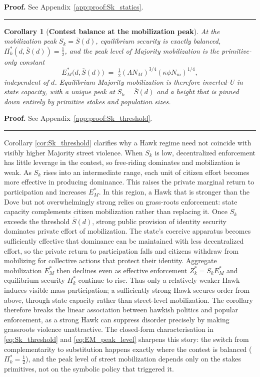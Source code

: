 \documentclass[11pt,twoside]{extarticle}
\newtheorem{corollary}{Corollary}
\newenvironment{proof}[1][Proof]{\noindent \textbf{#1.} }{\ \rule{0.5em}{0.5em}}
\begin{document}
\begin{proof}
See Appendix~\autoref{app:proof:Sk_statics}.
\end{proof}

\begin{corollary}[\textbf{Contest balance at the mobilization peak}] \label{cor:Sk_threshold}
At the mobilization peak $S_k=\overline{S}(d)$, equilibrium security is exactly balanced, $\Pi_k^*(d,\overline{S}(d))=\tfrac{1}{2}$, and the peak level of Majority mobilization is the primitive-only constant
\begin{equation} \label{eq:EM_peak_level}
E_M^*\big(d,\overline{S}(d)\big)\;=\;\tfrac{1}{2}(\Lambda N_M)^{3/4}(\kappa\phi N_m)^{1/4},
\end{equation}
independent of $d$. Equilibrium Majority mobilization is therefore inverted-U in state capacity, with a unique peak at $S_k=\overline{S}(d)$ and a height that is pinned down entirely by primitive stakes and population sizes.
\end{corollary}

\begin{proof}
See Appendix~\autoref{app:proof:Sk_threshold}.
\end{proof}

Corollary \autoref{cor:Sk_threshold} clarifies why a Hawk regime need not coincide with visibly higher Majority street violence. When $S_k$ is low, decentralized enforcement has little leverage in the contest, so free-riding dominates and mobilization is weak. As $S_k$ rises into an intermediate range, each unit of citizen effort becomes more effective in producing dominance. This raises the private marginal return to participation and increases $E_M^*$. In this region, a Hawk that is stronger than the Dove but not overwhelmingly strong relies on grass-roots enforcement: state capacity complements citizen mobilization rather than replacing it. Once $S_k$ exceeds the threshold $\overline{S}(d)$, strong public provision of identity security dominates private effort of mobilization. The state's coercive apparatus becomes sufficiently effective that dominance can be maintained with less decentralized effort, so the private return to participation falls and citizens withdraw from mobilizing for collective actions that protect their identity. Aggregate mobilization $E_M^*$ then declines even as effective enforcement $Z_k^*=S_kE_M^*$ and equilibrium security $\Pi_k^*$ continue to rise. Thus only a relatively weaker Hawk induces visible mass participation; a sufficiently strong Hawk secures order from above, through state capacity rather than street-level mobilization. The corollary therefore breaks the linear association between hawkish politics and popular enforcement, as a strong Hawk can suppress disorder precisely by making grassroots violence unattractive. The closed-form characterisation in \autoref{eq:Sk_threshold} and \autoref{eq:EM_peak_level} sharpens this story: the switch from complementarity to substitution happens exactly where the contest is balanced ($\Pi_k^*=\tfrac{1}{2}$), and the peak level of street mobilization depends only on the stakes primitives, not on the symbolic policy that triggered it.
\end{document}
